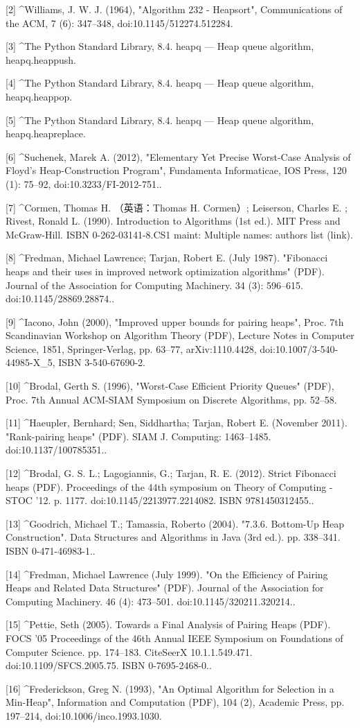 [2]
^Williams, J. W. J. (1964), "Algorithm 232 - Heapsort", Communications of the ACM, 7 (6): 347–348, doi:10.1145/512274.512284.

[3]
^The Python Standard Library, 8.4. heapq — Heap queue algorithm, heapq.heappush.

[4]
^The Python Standard Library, 8.4. heapq — Heap queue algorithm, heapq.heappop.

[5]
^The Python Standard Library, 8.4. heapq — Heap queue algorithm, heapq.heapreplace.

[6]
^Suchenek, Marek A. (2012), "Elementary Yet Precise Worst-Case Analysis of Floyd's Heap-Construction Program", Fundamenta Informaticae, IOS Press, 120 (1): 75–92, doi:10.3233/FI-2012-751..

[7]
^Cormen, Thomas H. （英语：Thomas H. Cormen）; Leiserson, Charles E. ; Rivest, Ronald L. (1990). Introduction to Algorithms (1st ed.). MIT Press and McGraw-Hill. ISBN 0-262-03141-8.CS1 maint: Multiple names: authors list (link).

[8]
^Fredman, Michael Lawrence; Tarjan, Robert E. (July 1987). "Fibonacci heaps and their uses in improved network optimization algorithms" (PDF). Journal of the Association for Computing Machinery. 34 (3): 596–615. doi:10.1145/28869.28874..

[9]
^Iacono, John (2000), "Improved upper bounds for pairing heaps", Proc. 7th Scandinavian Workshop on Algorithm Theory (PDF), Lecture Notes in Computer Science, 1851, Springer-Verlag, pp. 63–77, arXiv:1110.4428, doi:10.1007/3-540-44985-X_5, ISBN 3-540-67690-2.

[10]
^Brodal, Gerth S. (1996), "Worst-Case Efficient Priority Queues" (PDF), Proc. 7th Annual ACM-SIAM Symposium on Discrete Algorithms, pp. 52–58.

[11]
^Haeupler, Bernhard; Sen, Siddhartha; Tarjan, Robert E. (November 2011). "Rank-pairing heaps" (PDF). SIAM J. Computing: 1463–1485. doi:10.1137/100785351..

[12]
^Brodal, G. S. L.; Lagogiannis, G.; Tarjan, R. E. (2012). Strict Fibonacci heaps (PDF). Proceedings of the 44th symposium on Theory of Computing - STOC '12. p. 1177. doi:10.1145/2213977.2214082. ISBN 9781450312455..

[13]
^Goodrich, Michael T.; Tamassia, Roberto (2004). "7.3.6. Bottom-Up Heap Construction". Data Structures and Algorithms in Java (3rd ed.). pp. 338–341. ISBN 0-471-46983-1..

[14]
^Fredman, Michael Lawrence (July 1999). "On the Efficiency of Pairing Heaps and Related Data Structures" (PDF). Journal of the Association for Computing Machinery. 46 (4): 473–501. doi:10.1145/320211.320214..

[15]
^Pettie, Seth (2005). Towards a Final Analysis of Pairing Heaps (PDF). FOCS '05 Proceedings of the 46th Annual IEEE Symposium on Foundations of Computer Science. pp. 174–183. CiteSeerX 10.1.1.549.471. doi:10.1109/SFCS.2005.75. ISBN 0-7695-2468-0..

[16]
^Frederickson, Greg N. (1993), "An Optimal Algorithm for Selection in a Min-Heap", Information and Computation (PDF), 104 (2), Academic Press, pp. 197–214, doi:10.1006/inco.1993.1030.